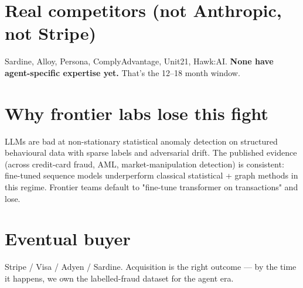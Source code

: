 \documentclass[11pt]{article}
\begin{document}
\section{Real competitors (not Anthropic, not Stripe)}
Sardine, Alloy, Persona, ComplyAdvantage, Unit21, Hawk:AI. \textbf{None have agent-specific expertise yet.} That's the 12--18 month window.

\section{Why frontier labs lose this fight}
LLMs are bad at non-stationary statistical anomaly detection on structured behavioural data with sparse labels and adversarial drift. The published evidence (across credit-card fraud, AML, market-manipulation detection) is consistent: fine-tuned sequence models underperform classical statistical + graph methods in this regime. Frontier teams default to "fine-tune transformer on transactions" and lose.

\section{Eventual buyer}
Stripe / Visa / Adyen / Sardine. Acquisition is the right outcome --- by the time it happens, we own the labelled-fraud dataset for the agent era.
\end{document}
